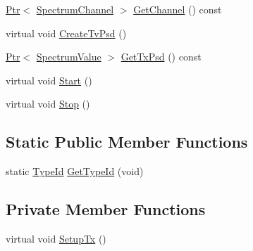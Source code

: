 \begin{DoxyCompactItemize}
\item 
\hyperlink{classns3_1_1Ptr}{Ptr}$<$ \hyperlink{classns3_1_1SpectrumChannel}{Spectrum\+Channel} $>$ \hyperlink{classns3_1_1TvSpectrumTransmitter_a015a7ebd2e4d0bea06f9449ab3b7554d}{Get\+Channel} () const 
\item 
virtual void \hyperlink{classns3_1_1TvSpectrumTransmitter_a263590a58711ab359413eb0aeafbb261}{Create\+Tv\+Psd} ()
\item 
\hyperlink{classns3_1_1Ptr}{Ptr}$<$ \hyperlink{classns3_1_1SpectrumValue}{Spectrum\+Value} $>$ \hyperlink{classns3_1_1TvSpectrumTransmitter_aef19a51b2de5fdb15d99e83c5af04af6}{Get\+Tx\+Psd} () const 
\item 
virtual void \hyperlink{classns3_1_1TvSpectrumTransmitter_a4e04495d66e499a4e91abda6e17cdd2b}{Start} ()
\item 
virtual void \hyperlink{classns3_1_1TvSpectrumTransmitter_a7b04e90119e2669341b1f37c804817ba}{Stop} ()
\end{DoxyCompactItemize}
\subsection*{Static Public Member Functions}
\begin{DoxyCompactItemize}
\item 
static \hyperlink{classns3_1_1TypeId}{Type\+Id} \hyperlink{classns3_1_1TvSpectrumTransmitter_a82207fc213ebdc94ba514178ebfdd9f7}{Get\+Type\+Id} (void)
\end{DoxyCompactItemize}
\subsection*{Private Member Functions}
\begin{DoxyCompactItemize}
\item 
virtual void \hyperlink{classns3_1_1TvSpectrumTransmitter_a7d7f5cd8ad48714106082f9e7bbd11f9}{Setup\+Tx} ()
\end{DoxyCompactItemize}

